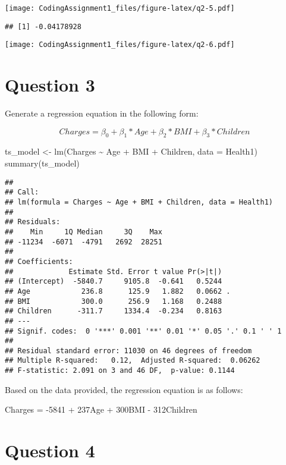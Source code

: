 \documentclass[
]{article}
\newenvironment{Shaded}{\begin{snugshade}}{\end{snugshade}}
\newcommand{\AttributeTok}[1]{\textcolor[rgb]{0.77,0.63,0.00}{#1}}
\newcommand{\FunctionTok}[1]{\textcolor[rgb]{0.00,0.00,0.00}{#1}}
\newcommand{\NormalTok}[1]{#1}
\newcommand{\OtherTok}[1]{\textcolor[rgb]{0.56,0.35,0.01}{#1}}
\newcommand{\SpecialCharTok}[1]{\textcolor[rgb]{0.00,0.00,0.00}{#1}}
\begin{document}
\texttt{[image: CodingAssignment1\_files/figure-latex/q2-5.pdf]}

\begin{verbatim}
## [1] -0.04178928
\end{verbatim}

\texttt{[image: CodingAssignment1\_files/figure-latex/q2-6.pdf]}

\hypertarget{question-3}{%
\section{Question 3}\label{question-3}}

Generate a regression equation in the following form:

\[Charges = \beta_{0}+\beta_{1}*Age+\beta_{2}*BMI+\beta_{3}*Children\]

\begin{Shaded}
\begin{Highlighting}[]
\NormalTok{ts\_model }\OtherTok{\textless{}{-}} \FunctionTok{lm}\NormalTok{(Charges }\SpecialCharTok{\textasciitilde{}}\NormalTok{ Age }\SpecialCharTok{+}\NormalTok{ BMI }\SpecialCharTok{+}\NormalTok{ Children, }\AttributeTok{data =}\NormalTok{ Health1)}
\FunctionTok{summary}\NormalTok{(ts\_model)}
\end{Highlighting}
\end{Shaded}

\begin{verbatim}
## 
## Call:
## lm(formula = Charges ~ Age + BMI + Children, data = Health1)
## 
## Residuals:
##    Min     1Q Median     3Q    Max 
## -11234  -6071  -4791   2692  28251 
## 
## Coefficients:
##             Estimate Std. Error t value Pr(>|t|)  
## (Intercept)  -5840.7     9105.8  -0.641   0.5244  
## Age            236.8      125.9   1.882   0.0662 .
## BMI            300.0      256.9   1.168   0.2488  
## Children      -311.7     1334.4  -0.234   0.8163  
## ---
## Signif. codes:  0 '***' 0.001 '**' 0.01 '*' 0.05 '.' 0.1 ' ' 1
## 
## Residual standard error: 11030 on 46 degrees of freedom
## Multiple R-squared:   0.12,  Adjusted R-squared:  0.06262 
## F-statistic: 2.091 on 3 and 46 DF,  p-value: 0.1144
\end{verbatim}

Based on the data provided, the regression equation is as follows:

Charges = -5841 + 237Age + 300BMI - 312Children

\hypertarget{question-4}{%
\section{Question 4}\label{question-4}}
\end{document}
